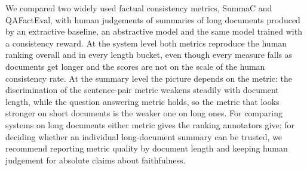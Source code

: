 We compared two widely used factual consistency metrics, SummaC and QAFactEval, with human judgements of summaries of long documents produced by an extractive baseline, an abstractive model and the same model trained with a consistency reward. At the system level both metrics reproduce the human ranking overall and in every length bucket, even though every measure falls as documents get longer and the scores are not on the scale of the human consistency rate. At the summary level the picture depends on the metric: the discrimination of the sentence-pair metric weakens steadily with document length, while the question answering metric holds, so the metric that looks stronger on short documents is the weaker one on long ones. For comparing systems on long documents either metric gives the ranking annotators give; for deciding whether an individual long-document summary can be trusted, we recommend reporting metric quality by document length and keeping human judgement for absolute claims about faithfulness.
